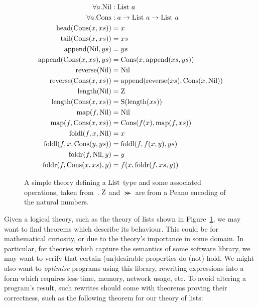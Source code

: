 \begin{figure}
  \begin{equation*}
    \begin{split}
      \forall a. \text{Nil}            &: \text{List} \ a                                  \\
      \forall a. \text{Cons}           &: a \rightarrow \text{List} \ a \rightarrow \text{List} \ a \\
      \text{head}(\text{Cons}(x, xs))        &= x                                       \\
      \text{tail}(\text{Cons}(x, xs))        &= xs                                      \\
      \text{append}(\text{Nil},         ys)  &= ys                                      \\
      \text{append}(\text{Cons}(x, xs), ys)  &= \text{Cons}(x, \text{append}(xs, ys))               \\
      \text{reverse}(\text{Nil})             &= \text{Nil}                                    \\
      \text{reverse}(\text{Cons}(x, xs))     &= \text{append}(\text{reverse}(xs), \text{Cons}(x, \text{Nil}))   \\
      \text{length}(\text{Nil})              &= \text{Z}                                   \\
      \text{length}(\text{Cons}(x, xs))      &= \text{S} (\text{length}(xs))                     \\
      \text{map}(f, \text{Nil})              &= \text{Nil}                                    \\
      \text{map}(f, \text{Cons}(x, xs))      &= \text{Cons}(f(x), \text{map}(f, xs))                \\
      \text{foldl}(f, x, \text{Nil})         &= x                                       \\
      \text{foldl}(f, x, \text{Cons}(y, ys)) &= \text{foldl}(f, f(x, y), ys)                  \\
      \text{foldr}(f, \text{Nil},         y) &= y                                       \\
      \text{foldr}(f, \text{Cons}(x, xs), y) &= f(x, \text{foldr}(f, xs, y))
    \end{split}
  \end{equation*}
  \caption{A simple theory defining a $\text{List}$ type and some associated
    operations, taken from~\cite{Johansson.Dixon.Bundy:conjecture-generation}.
    $\text{Z}$ and $\Succ$ are from a Peano encoding of the natural numbers.}
  \label{figure:list_theory}
\end{figure}

Given a logical theory, such as the theory of lists shown in
Figure~\ref{figure:list_theory}, we may want to find theorems which describe its
behaviour. This could be for mathematical curiosity, or due to the theory's
importance in some domain. In particular, for theories which capture the
semantics of some software library, we may want to verify that certain
(un)desirable properties do (not) hold. We might also want to \emph{optimise}
programs using this library, rewriting expressions into a form which requires
less time, memory, network usage, etc. To avoid altering a program's result,
such rewrites should come with theorems proving their correctness, such as the
following theorem for our theory of lists:

